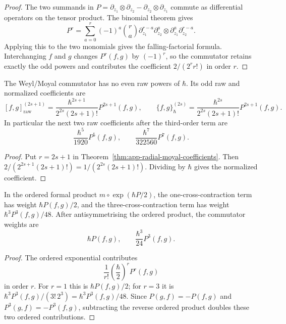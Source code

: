 \begin{proof}
  The two summands in
  \(P=\partial_{z_1}\otimes\partial_{z_2}
     -\partial_{z_2}\otimes\partial_{z_1}\)
  commute as differential operators on the tensor product.  The
  binomial theorem gives
  \[
    P^r=\sum_{a=0}^r(-1)^a\binom ra
      \partial_{z_1}^{r-a}\partial_{z_2}^{a}
      \otimes
      \partial_{z_1}^{a}\partial_{z_2}^{r-a}.
  \]
  Applying this to the two monomials gives the falling-factorial
  formula.  Interchanging \(f\) and \(g\) changes \(P^r(f,g)\) by
  \((-1)^r\), so the commutator retains exactly the odd powers and
  contributes the coefficient \(2/(2^r r!)\) in order \(r\).
\end{proof}

\begin{cor}
\label{cor:app-radial-all-odd-moyal-coefficients}
  The Weyl/Moyal commutator has no even raw powers of \(\hbar\).  Its
  odd raw and normalized coefficients are
  \[
    [f,g]_{\mathrm{raw}}^{(2s+1)}
      =
      \frac{\hbar^{2s+1}}{2^{2s}(2s+1)!}P^{2s+1}(f,g),
    \qquad
    \{f,g\}_\hbar^{(2s)}
      =
      \frac{\hbar^{2s}}{2^{2s}(2s+1)!}P^{2s+1}(f,g).
  \]
  In particular the next two raw coefficients after the third-order
  term are
  \[
    \frac{\hbar^5}{1920}P^5(f,g),\qquad
    \frac{\hbar^7}{322560}P^7(f,g).
  \]
\end{cor}

\begin{proof}
  Put \(r=2s+1\) in
  Theorem~\ref{thm:app-radial-moyal-coefficients}.  Then
  \(2/(2^{2s+1}(2s+1)!)=1/(2^{2s}(2s+1)!)\).  Dividing by \(\hbar\)
  gives the normalized coefficient.
\end{proof}

\begin{cor}
\label{cor:app-formal-first-third-weights}
  In the ordered formal product
  \(m\circ\exp(\hbar P/2)\), the one-cross-contraction term has weight
  \(\hbar P(f,g)/2\), and the three-cross-contraction term has weight
  \(\hbar^3P^3(f,g)/48\).  After antisymmetrising the ordered product,
  the commutator weights are
  \[
    \hbar P(f,g),\qquad \frac{\hbar^3}{24}P^3(f,g).
  \]
\end{cor}

\begin{proof}
  The ordered exponential contributes
  \[
    \frac{1}{r!}\left(\frac{\hbar}{2}\right)^r P^r(f,g)
  \]
  in order \(r\).  For \(r=1\) this is \(\hbar P(f,g)/2\); for \(r=3\)
  it is \(\hbar^3P^3(f,g)/(3!\,2^3)=\hbar^3P^3(f,g)/48\).  Since
  \(P(g,f)=-P(f,g)\) and \(P^3(g,f)=-P^3(f,g)\), subtracting the reverse
  ordered product doubles these two ordered contributions.
\end{proof}

